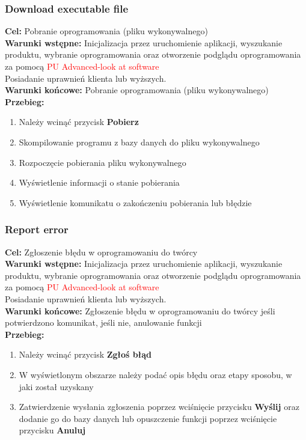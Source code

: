 \documentclass[12pt,a4paper]{article}
\begin{document}
\subsubsection{Download executable file}
\textbf{Cel: } Pobranie oprogramowania (pliku wykonywalnego) \\
\textbf{Warunki wstępne:} Inicjalizacja przez uruchomienie aplikacji,  wyszukanie produktu, wybranie oprogramowania oraz otworzenie podglądu oprogramowania za pomocą \textcolor{red}{PU Advanced-look at software}\\ Posiadanie uprawnień klienta lub wyższych.\\
\textbf{Warunki końcowe:} Pobranie oprogramowania (pliku wykonywalnego)\\
\textbf{Przebieg:}
\begin{enumerate}
    \item Należy wcinąć przycisk \textbf{Pobierz}
    \item Skompilowanie programu z bazy danych do pliku wykonywalnego
    \item Rozpoczęcie pobierania pliku wykonywalnego
    \item Wyświetlenie informacji o stanie pobierania
    \item Wyświetlenie komunikatu o zakończeniu pobierania lub błędzie
\end{enumerate}

\subsubsection{Report error}
\textbf{Cel: } Zgłoszenie błędu w oprogramowaniu do twórcy \\
\textbf{Warunki wstępne:} Inicjalizacja przez uruchomienie aplikacji,  wyszukanie produktu, wybranie oprogramowania oraz otworzenie podglądu oprogramowania za pomocą \textcolor{red}{PU Advanced-look at software}\\ Posiadanie uprawnień klienta lub wyższych.\\
\textbf{Warunki końcowe:} Zgłoszenie błędu w oprogramowaniu do twórcy jeśli potwierdzono komunikat, jeśli nie, anulowanie funkcji\\
\textbf{Przebieg:}
\begin{enumerate}
    \item Należy wcinąć przycisk \textbf{Zgłoś błąd}
    \item W wyświetlonym obszarze należy podać opis błędu oraz etapy sposobu, w jaki został uzyskany
    \item Zatwierdzenie wysłania zgłoszenia poprzez wciśnięcie przycisku \textbf{Wyślij} oraz dodanie go do bazy danych lub opuszczenie funkcji poprzez wciśnięcie przycisku \textbf{Anuluj}
\end{enumerate}
\end{document}
